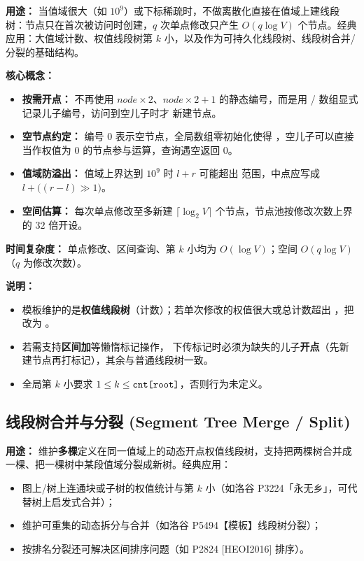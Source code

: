 \textbf{用途：}
当值域很大（如 $10^9$）或下标稀疏时，不做离散化直接在值域上建线段树：节点只在首次被访问时创建，$q$ 次单点修改只产生 $O(q \log V)$ 个节点。经典应用：大值域计数、权值线段树第 $k$ 小，以及作为可持久化线段树、线段树合并/分裂的基础结构。

\textbf{核心概念：}
\begin{itemize}
  \item \textbf{按需开点：} 不再使用 $node \times 2$、$node \times 2 + 1$ 的静态编号，而是用  /  数组显式记录儿子编号，访问到空儿子时才  新建节点。
  \item \textbf{空节点约定：} 编号 $0$ 表示空节点，全局数组零初始化使得 ，空儿子可以直接当作权值为 $0$ 的节点参与运算，查询遇空返回 $0$。
  \item \textbf{值域防溢出：} 值域上界达到 $10^9$ 时 $l + r$ 可能超出  范围，中点应写成 $l + \big((r - l) \gg 1\big)$。
  \item \textbf{空间估算：} 每次单点修改至多新建 $\lceil \log_2 V \rceil$ 个节点，节点池按修改次数上界的 $32$ 倍开设。
\end{itemize}

\textbf{时间复杂度：} 单点修改、区间查询、第 $k$ 小均为 $O(\log V)$；空间 $O(q \log V)$（$q$ 为修改次数）。



\textbf{说明：}
\begin{itemize}
  \item 模板维护的是\textbf{权值线段树}（计数）；若单次修改的权值很大或总计数超出 ，把  改为 。
  \item 若需支持\textbf{区间加}等懒惰标记操作， 下传标记时必须为缺失的儿子\textbf{开点}（先新建节点再打标记），其余与普通线段树一致。
  \item 全局第 $k$ 小要求 $1 \le k \le \texttt{cnt[root]}$，否则行为未定义。
\end{itemize}

\subsection{线段树合并与分裂 (Segment Tree Merge / Split)}

\textbf{用途：}
维护\textbf{多棵}定义在同一值域上的动态开点权值线段树，支持把两棵树合并成一棵、把一棵树中某段值域分裂成新树。经典应用：
\begin{itemize}
  \item 图上/树上连通块或子树的权值统计与第 $k$ 小（如洛谷 P3224「永无乡」，可代替树上启发式合并）；
  \item 维护可重集的动态拆分与合并（如洛谷 P5494【模板】线段树分裂）；
  \item 按排名分裂还可解决区间排序问题（如 P2824 [HEOI2016] 排序）。
\end{itemize}

